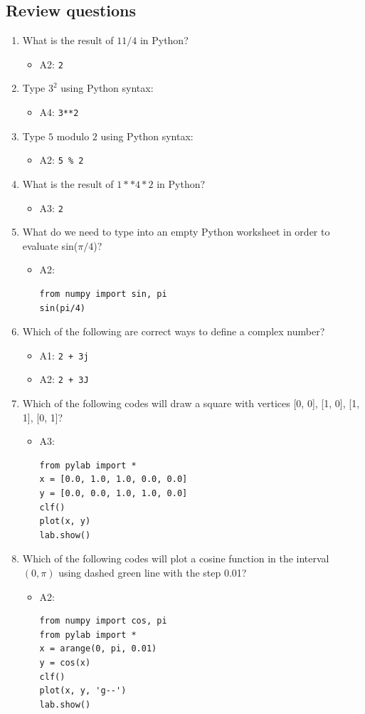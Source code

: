 \documentclass[article,A4,12pt]{llncs}
\begin{document}
\subsection{Review questions}

\begin{enumerate}
\item What is the result of $11 / 4$ in Python?
  \begin{itemize}
    \item A2: {\tt 2}
  \end{itemize}
\item Type $3^2$ using Python syntax:
  \begin{itemize}
    \item A4: {\tt 3**2}
  \end{itemize}
\item Type $5$ modulo $2$ using Python syntax:
  \begin{itemize}
    \item A2: {\tt 5 \% 2}
  \end{itemize}
\item What is the result of $1**4*2$ in Python?
  \begin{itemize}
    \item A3: {\tt 2}
  \end{itemize}
\item What do we need to type into an empty Python worksheet in order to evaluate sin($\pi/4$)?
  \begin{itemize}
    \item A2:
\begin{verbatim}
from numpy import sin, pi
sin(pi/4)
\end{verbatim}
  \end{itemize}
\item Which of the following are correct ways to define a complex number?
  \begin{itemize}
    \item A1: {\tt 2 + 3j}
    \item A2: {\tt 2 + 3J}
  \end{itemize}
\item Which of the following codes will draw a square with vertices [0, 0], [1, 0], [1, 1], [0, 1]?
  \begin{itemize}
    \item A3:
\begin{verbatim}
from pylab import *
x = [0.0, 1.0, 1.0, 0.0, 0.0]
y = [0.0, 0.0, 1.0, 1.0, 0.0]
clf()
plot(x, y)
lab.show()
\end{verbatim}
  \end{itemize}
\item Which of the following codes will plot a cosine function in the interval $(0, \pi)$ using dashed green line with
the step 0.01?
  \begin{itemize}
    \item A2:
\begin{verbatim}
from numpy import cos, pi
from pylab import *
x = arange(0, pi, 0.01)
y = cos(x)
clf()
plot(x, y, 'g--')
lab.show()
\end{verbatim}
  \end{itemize}
\end{enumerate}
\end{document}
